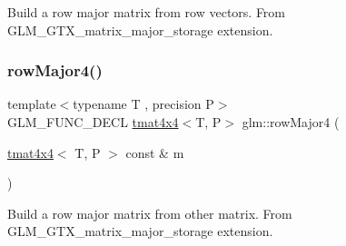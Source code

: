 Build a row major matrix from row vectors. From G\+L\+M\+\_\+\+G\+T\+X\+\_\+matrix\+\_\+major\+\_\+storage extension. \mbox{\label{group__gtx__matrix__major__storage_ga85771a88c114a088a0414bcfce55e729}} 
\subsubsection{\texorpdfstring{row\+Major4()}{rowMajor4()}\hspace{0.1cm}{\footnotesize\ttfamily [2/2]}}
{\footnotesize\ttfamily template$<$typename T , precision P$>$ \\
G\+L\+M\+\_\+\+F\+U\+N\+C\+\_\+\+D\+E\+CL \hyperlink{structglm_1_1tmat4x4}{tmat4x4}$<$T, P$>$ glm\+::row\+Major4 (\begin{DoxyParamCaption}\item[{\hyperlink{structglm_1_1tmat4x4}{tmat4x4}$<$ T, P $>$ const \&}]{m }\end{DoxyParamCaption})}

Build a row major matrix from other matrix. From G\+L\+M\+\_\+\+G\+T\+X\+\_\+matrix\+\_\+major\+\_\+storage extension. 